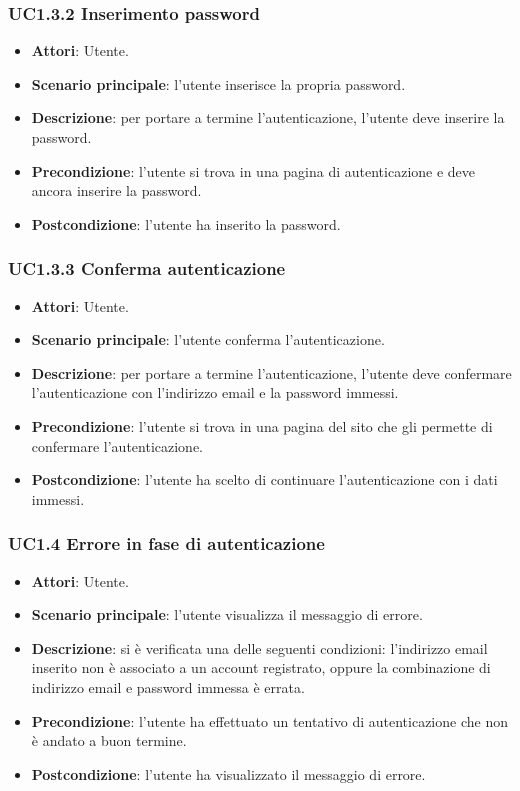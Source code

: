 \subsubsection{UC1.3.2 Inserimento password}
\begin{itemize}
\item \textbf{Attori}: Utente.
\item \textbf{Scenario principale}: l'utente inserisce la propria password.
\item \textbf{Descrizione}: per portare a termine l'autenticazione, l'utente deve inserire la password.
\item \textbf{Precondizione}: l'utente si trova in una pagina di autenticazione e deve ancora inserire la password.
\item \textbf{Postcondizione}: l'utente ha inserito la password.
\end{itemize}
\subsubsection{UC1.3.3 Conferma autenticazione}
\begin{itemize}
\item \textbf{Attori}: Utente.
\item \textbf{Scenario principale}: l'utente conferma l'autenticazione.
\item \textbf{Descrizione}: per portare a termine l'autenticazione, l'utente deve confermare l'autenticazione con l'indirizzo email e  la password immessi.
\item \textbf{Precondizione}: l'utente si trova in una pagina del sito  che gli permette di confermare l'autenticazione.
\item \textbf{Postcondizione}: l'utente ha scelto di continuare l'autenticazione con i dati immessi.
\end{itemize}
\subsubsection{UC1.4 Errore in fase di autenticazione}
\begin{itemize}
\item \textbf{Attori}: Utente.
\item \textbf{Scenario principale}: l'utente visualizza il messaggio di errore.
\item \textbf{Descrizione}: si è verificata una delle seguenti condizioni: l'indirizzo email inserito non è associato a un account registrato, oppure la combinazione di indirizzo email e password immessa è errata.
\item \textbf{Precondizione}: l'utente ha effettuato un tentativo di autenticazione che non è andato a buon termine.
\item \textbf{Postcondizione}: l'utente ha visualizzato il messaggio di errore.
\end{itemize}
